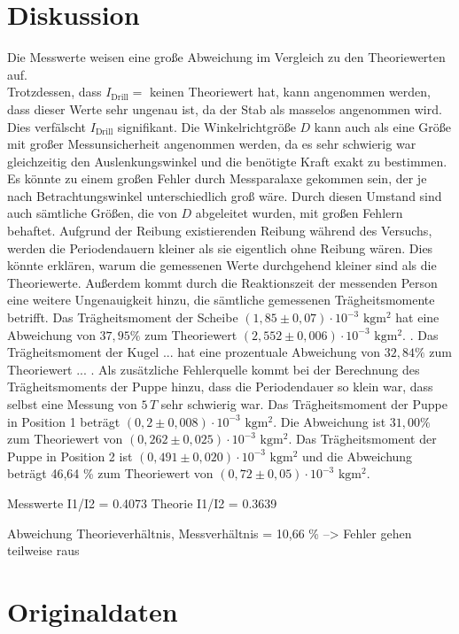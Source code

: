 \section{Diskussion}
\label{sec:Diskussion}
Die Messwerte weisen eine große Abweichung im Vergleich zu den Theoriewerten auf.  \\
Trotzdessen, dass $I_{\text{Drill}} = $ keinen Theoriewert hat, kann angenommen werden, dass dieser Werte sehr ungenau ist, da der Stab 
als masselos angenommen wird. Dies verfälscht $I_{\text{Drill}}$ signifikant. Die Winkelrichtgröße $D$ kann auch als eine Größe mit großer Messunsicherheit angenommen
werden, da es sehr schwierig war gleichzeitig den Auslenkungswinkel und die benötigte Kraft exakt zu bestimmen. Es könnte zu einem großen 
Fehler durch Messparalaxe gekommen sein, der je nach Betrachtungswinkel unterschiedlich groß wäre. Durch diesen Umstand sind auch sämtliche 
Größen, die von $D$ abgeleitet wurden, mit großen Fehlern behaftet. Aufgrund der Reibung existierenden Reibung während des Versuchs, werden die 
Periodendauern kleiner als sie eigentlich ohne Reibung wären. Dies könnte erklären, warum die gemessenen Werte durchgehend kleiner sind als die 
Theoriewerte. Außerdem kommt durch die Reaktionszeit der messenden Person eine weitere Ungenauigkeit hinzu, die sämtliche gemessenen 
Trägheitsmomente betrifft.
Das Trägheitsmoment der Scheibe $(1,85 \pm 0,07) \cdot 10^{-3} \,\,\unit{\kilo\gram\meter\squared}$ hat eine Abweichung von $37,95 \%$ zum Theoriewert $(2,552 \pm 0,006) \cdot 10^{-3} \,\,\unit{\kilo\gram\meter\squared}$.
 . Das Trägheitsmoment der Kugel $...$ hat eine prozentuale 
Abweichung von $32,84 \%$ zum Theoriewert ... . 
Als zusätzliche Fehlerquelle kommt bei der Berechnung des Trägheitsmoments der Puppe hinzu, dass die Periodendauer so klein war, dass selbst eine
Messung von $5\,T$ sehr schwierig war. Das Trägheitsmoment der Puppe in Position 1 beträgt $(0,2 \pm 0,008) \cdot 10^{-3}\,\, \unit{\kilo\gram\meter\squared}$.
 Die Abweichung ist $31,00 \%$ zum Theoriewert von $(0,262 \pm 0,025) \cdot 10^{-3}\,\, \unit{\kilo\gram\meter\squared}$.
Das Trägheitsmoment der Puppe in Position 2 ist $ (0,491 \pm 0,020) \cdot 10^{-3}\,\, \unit{\kilo\gram\meter\squared}$ und die Abweichung beträgt 46,64 \% zum Theoriewert 
von $(0,72 \pm 0,05) \cdot 10^{-3}\,\, \unit{\kilo\gram\meter\squared}$.

Messwerte I1/I2 = 0.4073
Theorie I1/I2 = 0.3639

Abweichung Theorieverhältnis, Messverhältnis = 10,66 \%
--> Fehler gehen teilweise raus 
\section{Originaldaten}
\label{sec:Originaldaten}
